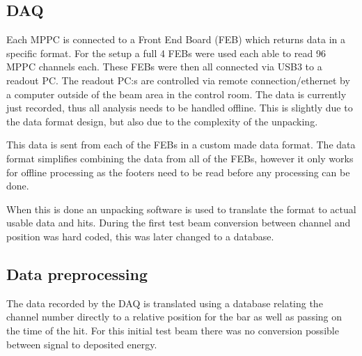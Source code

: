\subsection{DAQ}
Each MPPC is connected to a Front End Board (FEB) which returns data in a specific format. For the setup a full 4 FEBs were used each able to read 96 MPPC channels each. These FEBs were then all connected via USB3 to a readout PC. The readout PC:s are controlled via remote connection/ethernet by a computer outside of the beam area in the control room. The data is currently just recorded, thus all analysis needs to be handled offline. This is slightly due to the data format design, but also due to the complexity of the unpacking.


This data is sent from each of the FEBs in a custom made data format. The data format simplifies combining the data from all of the FEBs, however it only works for offline processing as the footers need to be read before any processing can be done.

When this is done an unpacking software is used to translate the format to actual usable data and hits. During the first test beam conversion between channel and position was hard coded, this was later changed to a database.  


\subsection{Data preprocessing}

The data recorded by the DAQ is translated using a database relating the channel number directly to a relative position for the bar as well as passing on the time of the hit. For this initial test beam there was no conversion possible between signal to deposited energy.

